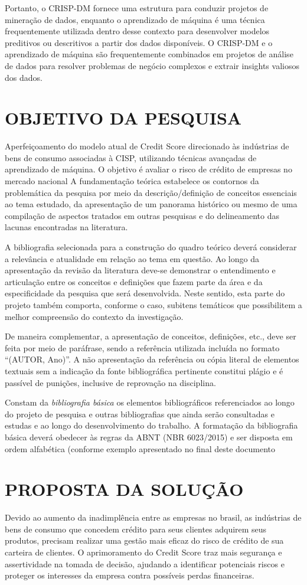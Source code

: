 \documentclass[12pt,a4paper]{article}
\begin{document}
Portanto, o CRISP-DM fornece uma estrutura para conduzir projetos de mineração de dados, enquanto o aprendizado de máquina é uma técnica frequentemente utilizada dentro desse contexto para desenvolver modelos preditivos ou descritivos a partir dos dados disponíveis. O CRISP-DM e o aprendizado de máquina são frequentemente combinados em projetos de análise de dados para resolver problemas de negócio complexos e extrair insights valiosos dos dados.
\section{OBJETIVO DA PESQUISA}
Aperfeiçoamento do modelo atual de Credit Score direcionado às indústrias de bens de consumo associadas à CISP, utilizando técnicas avançadas de aprendizado de máquina. O objetivo é avaliar o risco de crédito de empresas no mercado nacional
A fundamentação teórica estabelece os contornos da problemática da pesquisa por meio da descrição/definição de conceitos essenciais ao tema estudado, da apresentação de um panorama histórico ou mesmo de uma compilação de aspectos tratados em outras pesquisas e do delineamento das lacunas encontradas na literatura.

A bibliografia selecionada para a construção do quadro teórico deverá considerar a relevância e atualidade em relação ao tema em questão. Ao longo da apresentação da revisão da literatura deve-se demonstrar o entendimento e articulação entre os conceitos e definições que fazem parte da área e da especificidade da pesquisa que será desenvolvida. Neste sentido, esta parte do projeto também comporta, conforme o caso, subitens temáticos que possibilitem a melhor compreensão do contexto da investigação.

De maneira complementar, a apresentação de conceitos, definições, etc., deve ser feita por meio de paráfrase, sendo a referência utilizada incluída no formato ``(AUTOR, Ano)''. A não apresentação da referência ou cópia literal de elementos textuais sem a indicação da fonte bibliográfica pertinente constitui plágio e é passível de punições, inclusive de reprovação na disciplina.

Constam da {\it bibliografia básica} os elementos bibliográficos referenciados ao longo do projeto de pesquisa e outras bibliografias que ainda serão consultadas e estudas e ao longo do desenvolvimento do trabalho. A formatação da bibliografia básica deverá obedecer às regras da ABNT (NBR 6023/2015) e ser disposta em ordem alfabética (conforme exemplo apresentado no final deste documento
\section{PROPOSTA DA SOLUÇÃO}
Devido ao aumento da inadimplência entre as empresas no brasil, as indústrias de bens de consumo que concedem crédito para seus clientes adquirem seus produtos, precisam realizar uma gestão mais eficaz do risco de crédito de sua carteira de clientes. O aprimoramento do Credit Score traz mais segurança e assertividade na tomada de decisão, ajudando a identificar potenciais riscos e proteger os interesses da empresa contra possíveis perdas financeiras.
\end{document}
